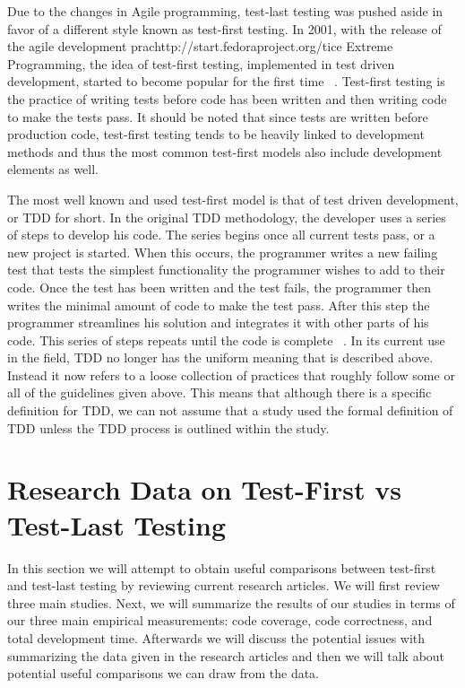 \documentclass{sig-alternate}
\begin{document}
Due to the changes in Agile programming, test-last testing was pushed aside in favor of a different style known as test-first testing.  In 2001, with the release of the agile development prachttp://start.fedoraproject.org/tice Extreme Programming, the idea of test-first testing, implemented in test driven development, started to become popular for the first time ~\cite{Hammond:2012}. Test-first testing is the practice of writing tests before code has been written and then writing code to make the tests pass.  It should be noted that since tests are written before production code, test-first testing tends to be heavily linked to development methods and thus the most common test-first models also include development elements as well. 

The most well known and used test-first model is that of test driven development, or TDD for short.  In the original TDD methodology, the developer uses a series of steps to develop his code.  The series begins once all current tests pass, or a new project is started.  When this occurs, the programmer writes a new failing test that tests the simplest functionality the programmer wishes to add to their code.  Once the test has been written and the test fails, the programmer then writes the minimal amount of code to make the test pass.  After this step the programmer streamlines his solution and integrates it with other parts of his code.  This series of steps repeats until the code is complete ~\cite{Hammond:2012}.  In its current use in the field, TDD no longer has the uniform meaning that is described above.  Instead it now refers to a loose collection of practices that roughly follow some or all of the guidelines given above.  This means that although there is a specific definition for TDD, we can not assume that a study used the formal definition of TDD unless the TDD process is outlined within the study. 

\section{Research Data on Test-First vs Test-Last Testing}
In this section we will attempt to obtain useful comparisons between test-first and test-last testing by reviewing current research articles. We will first review three main studies.  Next, we will summarize the results of our studies in terms of our three main empirical measurements: code coverage, code correctness, and total development time.  Afterwards we will discuss the potential issues with summarizing the data given in the research articles and then we will talk about potential useful comparisons we can draw from the data. 
\end{document}
